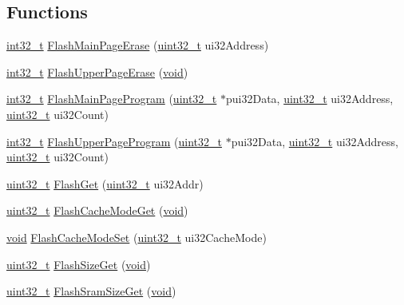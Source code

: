 \subsection*{Functions}
\begin{DoxyCompactItemize}
\item 
\hyperlink{_p_e___types_8h_adb828ef50c2dbb783109824e94cf6c47}{int32\+\_\+t} \hyperlink{group__flash__api_gaedcc8d25fdce7a51b46e6d37629dbef3}{Flash\+Main\+Page\+Erase} (\hyperlink{_p_e___types_8h_a33594304e786b158f3fb30289278f5af}{uint32\+\_\+t} ui32\+Address)
\item 
\hyperlink{_p_e___types_8h_adb828ef50c2dbb783109824e94cf6c47}{int32\+\_\+t} \hyperlink{group__flash__api_ga67d5a1a47713df085c99877079365f04}{Flash\+Upper\+Page\+Erase} (\hyperlink{usb__devapi_8h_afabf60e7f57651d6d595a02c75f07cd0}{void})
\item 
\hyperlink{_p_e___types_8h_adb828ef50c2dbb783109824e94cf6c47}{int32\+\_\+t} \hyperlink{group__flash__api_ga15cabe29d0066e6c37e0ccfd452e6adc}{Flash\+Main\+Page\+Program} (\hyperlink{_p_e___types_8h_a33594304e786b158f3fb30289278f5af}{uint32\+\_\+t} $\ast$pui32\+Data, \hyperlink{_p_e___types_8h_a33594304e786b158f3fb30289278f5af}{uint32\+\_\+t} ui32\+Address, \hyperlink{_p_e___types_8h_a33594304e786b158f3fb30289278f5af}{uint32\+\_\+t} ui32\+Count)
\item 
\hyperlink{_p_e___types_8h_adb828ef50c2dbb783109824e94cf6c47}{int32\+\_\+t} \hyperlink{group__flash__api_ga2a92b46846b2919278a852f0a4b1ffcf}{Flash\+Upper\+Page\+Program} (\hyperlink{_p_e___types_8h_a33594304e786b158f3fb30289278f5af}{uint32\+\_\+t} $\ast$pui32\+Data, \hyperlink{_p_e___types_8h_a33594304e786b158f3fb30289278f5af}{uint32\+\_\+t} ui32\+Address, \hyperlink{_p_e___types_8h_a33594304e786b158f3fb30289278f5af}{uint32\+\_\+t} ui32\+Count)
\item 
\hyperlink{_p_e___types_8h_a33594304e786b158f3fb30289278f5af}{uint32\+\_\+t} \hyperlink{group__flash__api_gaec19050e37101a648c689b3f40d8da90}{Flash\+Get} (\hyperlink{_p_e___types_8h_a33594304e786b158f3fb30289278f5af}{uint32\+\_\+t} ui32\+Addr)
\item 
\hyperlink{_p_e___types_8h_a33594304e786b158f3fb30289278f5af}{uint32\+\_\+t} \hyperlink{group__flash__api_gac9664ecdcf054a53ec8e6d896cc3753c}{Flash\+Cache\+Mode\+Get} (\hyperlink{usb__devapi_8h_afabf60e7f57651d6d595a02c75f07cd0}{void})
\item 
\hyperlink{usb__devapi_8h_afabf60e7f57651d6d595a02c75f07cd0}{void} \hyperlink{group__flash__api_gae786aab0fb4bcec9149c918c09fafa15}{Flash\+Cache\+Mode\+Set} (\hyperlink{_p_e___types_8h_a33594304e786b158f3fb30289278f5af}{uint32\+\_\+t} ui32\+Cache\+Mode)
\item 
\hyperlink{_p_e___types_8h_a33594304e786b158f3fb30289278f5af}{uint32\+\_\+t} \hyperlink{group__flash__api_ga79bccd4cdbd7930d880df9e185935d41}{Flash\+Size\+Get} (\hyperlink{usb__devapi_8h_afabf60e7f57651d6d595a02c75f07cd0}{void})
\item 
\hyperlink{_p_e___types_8h_a33594304e786b158f3fb30289278f5af}{uint32\+\_\+t} \hyperlink{group__flash__api_gad3d3b9146ff61723dddacaa27b82385c}{Flash\+Sram\+Size\+Get} (\hyperlink{usb__devapi_8h_afabf60e7f57651d6d595a02c75f07cd0}{void})
\end{DoxyCompactItemize}


